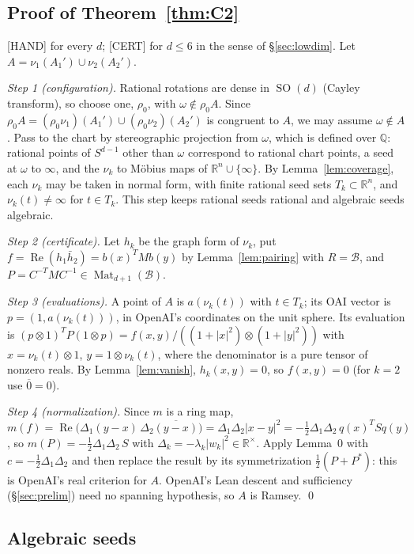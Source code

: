 \documentclass[11pt]{amsart}
\newcommand{\st}[1]{\textsf{[#1]}}
\newcommand{\Q}{\mathbb{Q}}
\newcommand{\R}{\mathbb{R}}
\newcommand{\Rea}{\operatorname{Re}}
\newcommand{\BB}{\mathscr{B}}
\DeclareMathOperator{\SO}{SO}
\DeclareMathOperator{\Mat}{Mat}
\theoremstyle{plain}
\theoremstyle{definition}
\begin{document}
\subsection{Proof of Theorem~\ref{thm:C2}}\label{sec:proofC2}

\st{HAND} for every $d$; \st{CERT} for $d\le6$ in the sense of \S\ref{sec:lowdim}. Let
$A=\nu_1(A_1')\cup\nu_2(A_2')$.

\emph{Step 1 (configuration).} Rational rotations are dense in $\SO(d)$ (Cayley transform), so
choose one, $\rho_0$, with $\omega\notin\rho_0A$. Since $\rho_0A=(\rho_0\nu_1)(A_1')\cup(\rho_0\nu_2)(A_2')$ is
congruent to $A$, we may assume $\omega\notin A$. Pass to the chart by stereographic projection from
$\omega$, which is defined over $\Q$: rational points of $S^{d-1}$ other than $\omega$ correspond to
rational chart points, a seed at $\omega$ to $\infty$, and the $\nu_k$ to M\"obius maps of $\R^n\cup\{\infty\}$. By
Lemma~\ref{lem:coverage}, each $\nu_k$ may be taken in normal form, with finite rational seed sets
$T_k\subset\R^n$, and $\nu_k(t)\neq\infty$ for $t\in T_k$. This step keeps rational seeds
rational and algebraic seeds algebraic.

\emph{Step 2 (certificate).} Let $h_k$ be the graph form of $\nu_k$, put
$f=\Rea(h_1\bar h_2)=b(x)^TMb(y)$ by Lemma~\ref{lem:pairing} with $R=\BB$, and
$P=C^{-T}MC^{-1}\in\Mat_{d+1}(\BB)$.

\emph{Step 3 (evaluations).} A point of $A$ is $a(\nu_k(t))$ with $t\in T_k$; its OAI vector is
$p=(1,a(\nu_k(t)))$, in OpenAI's coordinates on the unit sphere. Its evaluation is
$(p\otimes1)^TP(1\otimes p)=f(x,y)/((1+|x|^2)\otimes(1+|y|^2))$ with $x=\nu_k(t)\otimes1$,
$y=1\otimes\nu_k(t)$, where the denominator is a pure tensor of nonzero reals. By
Lemma~\ref{lem:vanish}, $h_k(x,y)=0$, so $f(x,y)=0$ (for $k=2$ use $\overline{0}=0$).

\emph{Step 4 (normalization).} Since $m$ is a ring map, $m(f)=\Rea\bigl(\Delta_1(y-x)\,\Delta_2\overline{(y-x)}\bigr)
=\Delta_1\Delta_2|x-y|^2=-\tfrac12\Delta_1\Delta_2\,q(x)^TSq(y)$, so $m(P)=-\tfrac12\Delta_1\Delta_2\,S$
with $\Delta_k=-\lambda_k|w_k|^2\in\R^\times$. Apply Lemma~0 with $c=-\tfrac12\Delta_1\Delta_2$ and then
replace the result by its symmetrization $\tfrac12(P+P^*)$: this is OpenAI's real criterion for $A$. OpenAI's Lean descent and
sufficiency (\S\ref{sec:prelim}) need no spanning hypothesis, so $A$ is Ramsey. \qed

\subsection{Algebraic seeds}\label{sec:seeds}
\end{document}
